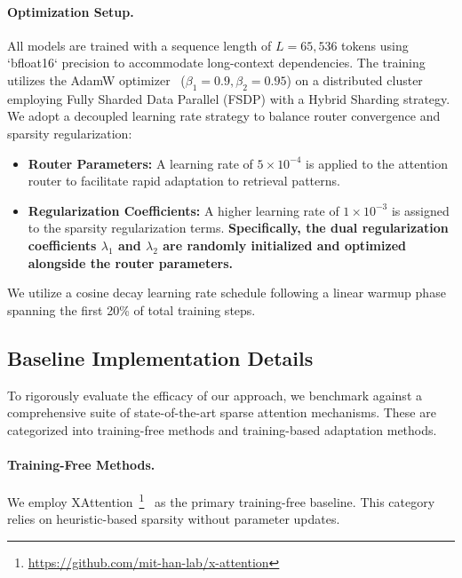 \paragraph{Optimization Setup.}
All models are trained with a sequence length of $L=65,536$ tokens using `bfloat16` precision to accommodate long-context dependencies.
The training utilizes the AdamW optimizer~\citep{loshchilov2019decoupledweightdecayregularization} ($\beta_1=0.9, \beta_2=0.95$) on a distributed cluster employing Fully Sharded Data Parallel (FSDP) with a Hybrid Sharding strategy.
We adopt a decoupled learning rate strategy to balance router convergence and sparsity regularization:
\begin{itemize}
    \item \textbf{Router Parameters:} A learning rate of $5\times 10^{-4}$ is applied to the attention router to facilitate rapid adaptation to retrieval patterns.
    \item \textbf{Regularization Coefficients:} A higher learning rate of $1\times 10^{-3}$ is assigned to the sparsity regularization terms. \textbf{Specifically, the dual regularization coefficients $\lambda_1$ and $\lambda_2$ are randomly initialized and optimized alongside the router parameters.}
\end{itemize}
We utilize a cosine decay learning rate schedule following a linear warmup phase spanning the first 20\% of total training steps.

\subsection{Baseline Implementation Details}
\label{appendix:baseline_train_setting}

To rigorously evaluate the efficacy of our approach, we benchmark against a comprehensive suite of state-of-the-art sparse attention mechanisms. These are categorized into training-free methods and training-based adaptation methods.

\paragraph{Training-Free Methods.}
We employ XAttention~\footnote{\url{https://github.com/mit-han-lab/x-attention}}~\citep{xattention} as the primary training-free baseline. 
This category relies on heuristic-based sparsity without parameter updates.

